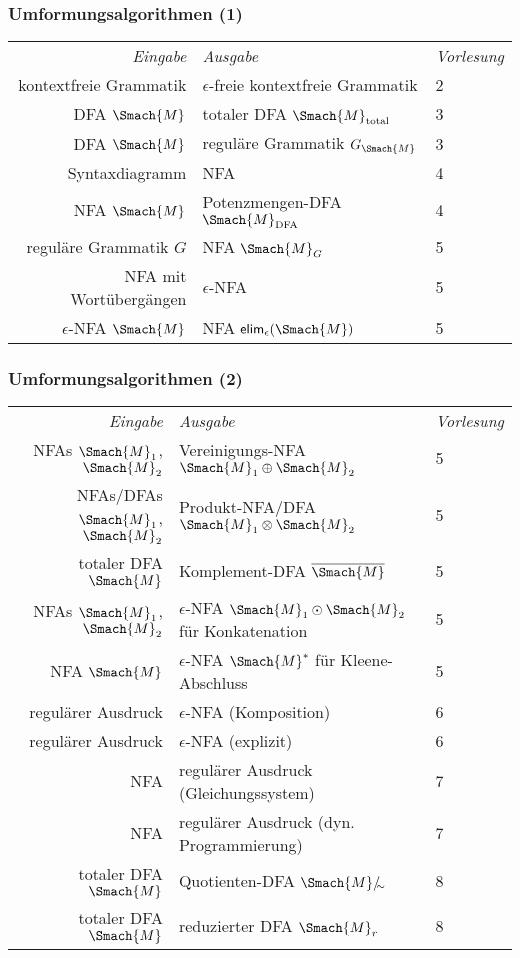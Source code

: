 \documentclass[aspectratio=1610,onlymath]{beamer}
\begin{document}
\begin{frame}[fragile]

\end{frame}

\newcommand{\simquot}[1]{#1/_{\!\!{\sim}}}

\begin{frame}\frametitle{Umformungsalgorithmen (1)}

\begin{tabular}{@{}rll@{}}
\emph{Eingabe} & \emph{Ausgabe} & \emph{Vorlesung} \\
kontextfreie Grammatik & $\epsilon$-freie kontextfreie Grammatik & 2\\
DFA $\Smach{M}$ & totaler DFA $\Smach{M}_{\text{total}}$ & 3\\
DFA $\Smach{M}$ & reguläre Grammatik $G_{\Smach{M}}$ & 3\\
Syntaxdiagramm & NFA & 4\\
NFA $\Smach{M}$ & Potenzmengen-DFA $\Smach{M}_{\text{DFA}}$ & 4\\
reguläre Grammatik $G$ & NFA $\Smach{M}_G$ & 5\\
NFA mit Wortübergängen & $\epsilon$-NFA & 5\\
$\epsilon$-NFA $\Smach{M}$ & NFA $\textsf{elim}_\epsilon(\Smach{M})$ & 5
\end{tabular}

\end{frame}

\begin{frame}\frametitle{Umformungsalgorithmen (2)}

\begin{tabular}{@{}rll@{}}
\emph{Eingabe} & \emph{Ausgabe} & \emph{Vorlesung} \\
NFAs $\Smach{M}_1$, $\Smach{M}_2$ & Vereinigungs-NFA $\Smach{M}_1\oplus\Smach{M}_2$ & 5\\
NFAs/DFAs $\Smach{M}_1$, $\Smach{M}_2$ & Produkt-NFA/DFA $\Smach{M}_1\otimes\Smach{M}_2$ & 5\\
totaler DFA $\Smach{M}$ & Komplement-DFA $\overline{\Smach{M}}$ & 5\\
NFAs $\Smach{M}_1$, $\Smach{M}_2$ & $\epsilon$-NFA $\Smach{M}_1\odot\Smach{M}_2$ für Konkatenation & 5\\
NFA $\Smach{M}$ & $\epsilon$-NFA $\Smach{M}^*$ für Kleene-Abschluss & 5\\
regulärer Ausdruck & $\epsilon$-NFA (Komposition) & 6 \\
regulärer Ausdruck & $\epsilon$-NFA (explizit) & 6 \\
NFA & regulärer Ausdruck (Gleichungssystem) & 7 \\
NFA & regulärer Ausdruck (dyn. Programmierung) & 7 \\
totaler DFA $\Smach{M}$ & Quotienten-DFA $\simquot{\Smach{M}}$ & 8 \\
totaler DFA $\Smach{M}$ & reduzierter DFA $\Smach{M}_r$ & 8
\end{tabular}

\end{frame}
\end{document}

